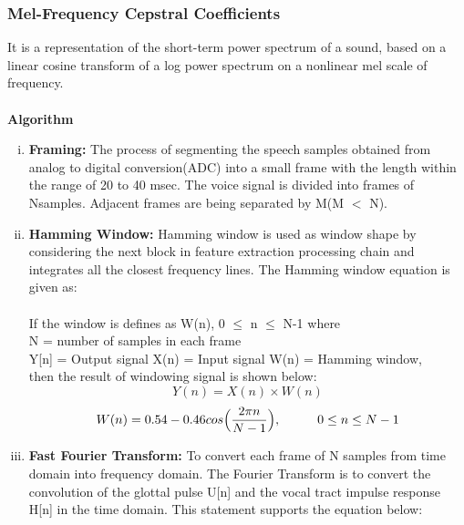 \subsubsection{Mel-Frequency Cepstral Coefficients}
It is a representation of the short-term power spectrum of a sound, based on a linear cosine 
transform of a log power spectrum on a nonlinear mel scale of frequency.\\
\\
\textbf{Algorithm}
\begin{enumerate}[(i)]
        \item \textbf{Framing:}
                The process of segmenting the speech samples obtained from analog to digital conversion(ADC) into a small frame with the length within
                the range of 20 to 40 msec. The voice signal is divided into frames of Nsamples. Adjacent frames are being separated by M(M $<$ N).
        \item \textbf{Hamming Window:}
                Hamming window is used as window shape by considering the next block in feature extraction processing chain and integrates all the 
                closest frequency lines. The Hamming window equation is given as:\\
                \\
                If the window is defines as W(n), 0 $\le$ n $\le$ N-1 where\\
                N = number of samples in each frame\\
                Y[n] = Output signal
                X(n) = Input signal
                W(n) = Hamming window,\\
                then the result of windowing signal is shown below:
                \begin{equation}
                        Y(n) = X(n) \times W(n)
                \end{equation}
                \begin{equation}
                        W(n) = 0.54 - 0.46cos\Big(\frac{2 \pi n}{N-1}\Big), \hspace{10mm}0 \le n \le N-1
                \end{equation}
        \item \textbf{Fast Fourier Transform:}
                To convert each frame of N samples from time domain into frequency domain. The Fourier Transform is to convert the
                convolution of the glottal pulse U[n] and the vocal tract impulse response H[n] in the time domain. This statement supports the equation below:

\end{enumerate}
